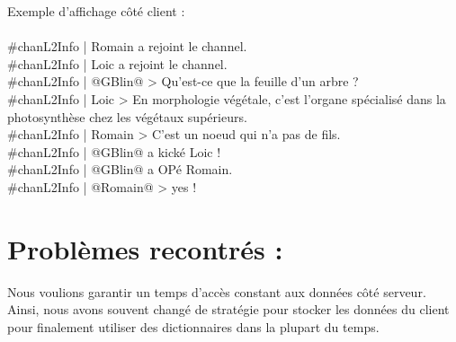 \documentclass[12pt]{article}
\begin{document}
{Exemple d'affichage côté client :
\\
\\
\#chanL2Info | Romain a rejoint le channel.\\
\#chanL2Info | Loic a rejoint le channel.\\
\#chanL2Info | @GBlin@ > Qu'est-ce que la feuille d'un arbre ?\\
\#chanL2Info | Loic > En morphologie végétale, c'est l'organe spécialisé dans la photosynthèse chez les végétaux supérieurs.\\
\#chanL2Info | Romain > C'est un noeud qui n'a pas de fils.\\
\#chanL2Info | @GBlin@ a kické Loic !\\
\#chanL2Info | @GBlin@ a OPé Romain.\\
\#chanL2Info | @Romain@ > yes !\\


\section{Problèmes recontrés :}

Nous voulions garantir un temps d'accès constant aux données côté serveur. Ainsi, nous avons souvent changé de stratégie
pour stocker les données du client pour finalement utiliser des dictionnaires dans la plupart du temps.
\\

}
\end{document}
